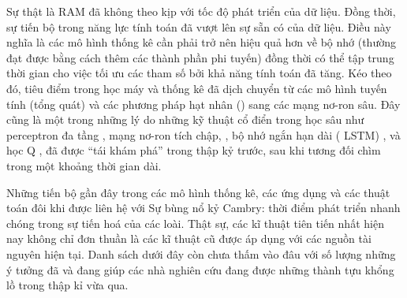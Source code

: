 \documentclass[letterpaper,11pt,english]{sphinxmanual}
\begin{document}
Sự thật là RAM đã không theo kịp với tốc độ phát triển của dữ liệu. Đồng
thời, sự tiến bộ trong năng lực tính toán đã vượt lên sự sẵn có của dữ
liệu. Điều này nghĩa là các mô hình thống kê cần phải trở nên hiệu quả
hơn về bộ nhớ (thường đạt được bằng cách thêm các thành phần phi tuyến)
đồng thời có thể tập trung thời gian cho việc tối ưu các tham số bởi khả
năng tính toán đã tăng. Kéo theo đó, tiêu điểm trong học máy và thống kê
đã dịch chuyển từ các mô hình tuyến tính (tổng quát) và các phương pháp
hạt nhân () sang các mạng nơ-ron sâu. Đây cũng là một
trong những lý do những kỹ thuật cổ điển trong học sâu như perceptron đa
tầng , mạng nơ-ron tích chập,
, bộ nhớ ngắn hạn dài ( \textendash{} LSTM) , và học
Q , đã được “tái khám phá” trong thập kỷ
trước, sau khi tương đối chìm trong một khoảng thời gian dài.



Những tiến bộ gần đây trong các mô hình thống kê, các ứng dụng và các
thuật toán đôi khi được liên hệ với Sự bùng nổ kỷ Cambry: thời điểm phát
triển nhanh chóng trong sự tiến hoá của các loài. Thật sự, các kĩ thuật
tiên tiến nhất hiện nay không chỉ đơn thuần là các kĩ thuật cũ được áp
dụng với các nguồn tài nguyên hiện tại. Danh sách dưới đây còn chưa thấm
vào đâu với số lượng những ý tưởng đã và đang giúp các nhà nghiên cứu
đang được những thành tựu khổng lồ trong thập kỉ vừa qua.

























\end{document}
